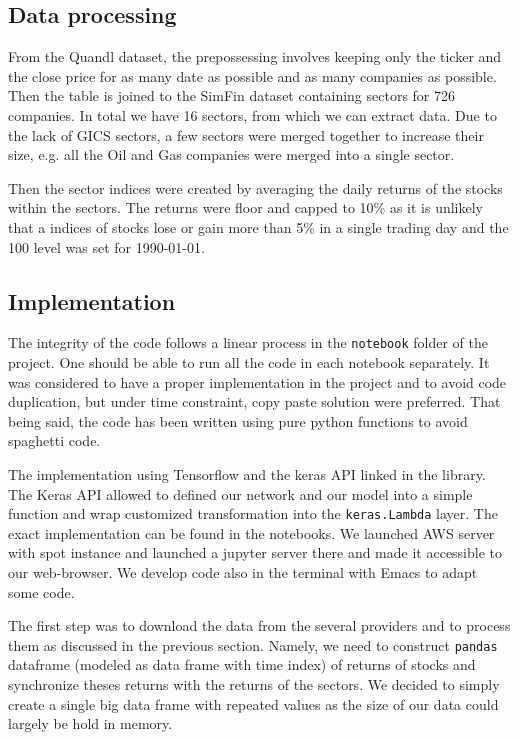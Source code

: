 \documentclass[a4paper,twoside]{article}
\begin{document}
\subsection{Data processing}
\label{sec:orge16cd46}

From the Quandl dataset, the prepossessing involves keeping only the ticker
and the close price for as many date as possible and as many companies as
possible. Then the table is joined to the SimFin dataset containing sectors
for 726 companies. In total we have 16 sectors, from which we can extract
data. Due to the lack of GICS sectors, a few sectors were merged together to
increase their size, e.g. all the Oil and Gas companies were merged into a
single sector.

Then the sector indices were created by averaging the daily returns of the
stocks within the sectors. The returns were floor and capped to 10\% as it is
unlikely that a indices of stocks lose or gain more than 5\% in a single
trading day and the 100 level was set for 1990-01-01.

\subsection{Implementation}
\label{sec:org6549843}

The integrity of the code follows a linear process in the \texttt{notebook} folder
of the project. One should be able to run all the code in each notebook
separately. It was considered to have a proper implementation in the project
and to avoid code duplication, but under time constraint, copy paste solution
were preferred. That being said, the code has been written using pure python
functions to avoid spaghetti code.

The implementation using Tensorflow and the keras API linked in the library.
The Keras API allowed to defined our network and our model into a simple
function and wrap customized transformation into the \texttt{keras.Lambda} layer.
The exact implementation can be found in the notebooks. We launched AWS
server with spot instance and launched a jupyter server there and made it
accessible to our web-browser. We develop code also in the terminal with
Emacs to adapt some code.

The first step was to download the data from the several providers and to
process them as discussed in the previous section. Namely, we need to
construct \texttt{pandas} dataframe (modeled as data frame with time index) of
returns of stocks and synchronize theses returns with the returns of the
sectors. We decided to simply create a single big data frame with repeated
values as the size of our data could largely be hold in memory.
\end{document}

